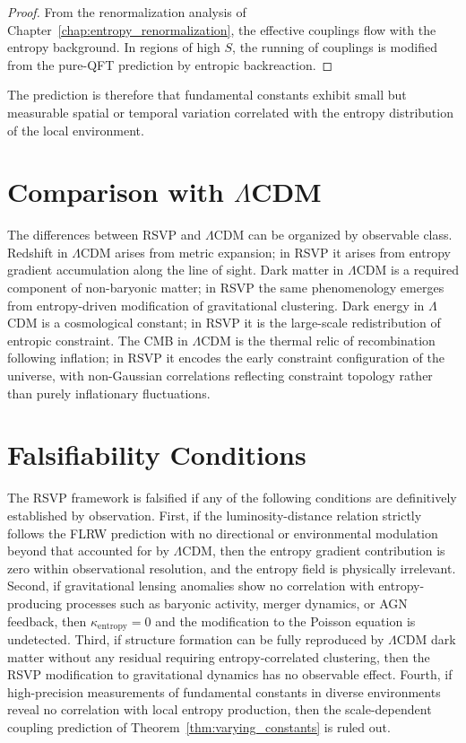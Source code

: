 \documentclass[12pt,a4paper,openany]{book}
\theoremstyle{plain}
\theoremstyle{definition}
\theoremstyle{remark}
\begin{document}
\begin{proof}
From the renormalization analysis of Chapter~\ref{chap:entropy_renormalization}, the effective couplings flow with the entropy background. In regions of high $S$, the running of couplings is modified from the pure-QFT prediction by entropic backreaction.
\end{proof}

The prediction is therefore that fundamental constants exhibit small but measurable spatial or temporal variation correlated with the entropy distribution of the local environment.

\section{Comparison with $\Lambda$CDM}

The differences between RSVP and $\Lambda$CDM can be organized by observable class. Redshift in $\Lambda$CDM arises from metric expansion; in RSVP it arises from entropy gradient accumulation along the line of sight. Dark matter in $\Lambda$CDM is a required component of non-baryonic matter; in RSVP the same phenomenology emerges from entropy-driven modification of gravitational clustering. Dark energy in $\Lambda$CDM is a cosmological constant; in RSVP it is the large-scale redistribution of entropic constraint. The CMB in $\Lambda$CDM is the thermal relic of recombination following inflation; in RSVP it encodes the early constraint configuration of the universe, with non-Gaussian correlations reflecting constraint topology rather than purely inflationary fluctuations.

\section{Falsifiability Conditions}

The RSVP framework is falsified if any of the following conditions are definitively established by observation. First, if the luminosity-distance relation strictly follows the FLRW prediction with no directional or environmental modulation beyond that accounted for by $\Lambda$CDM, then the entropy gradient contribution is zero within observational resolution, and the entropy field is physically irrelevant. Second, if gravitational lensing anomalies show no correlation with entropy-producing processes such as baryonic activity, merger dynamics, or AGN feedback, then $\kappa_{\mathrm{entropy}} = 0$ and the modification to the Poisson equation is undetected. Third, if structure formation can be fully reproduced by $\Lambda$CDM dark matter without any residual requiring entropy-correlated clustering, then the RSVP modification to gravitational dynamics has no observable effect. Fourth, if high-precision measurements of fundamental constants in diverse environments reveal no correlation with local entropy production, then the scale-dependent coupling prediction of Theorem~\ref{thm:varying_constants} is ruled out.
\end{document}
